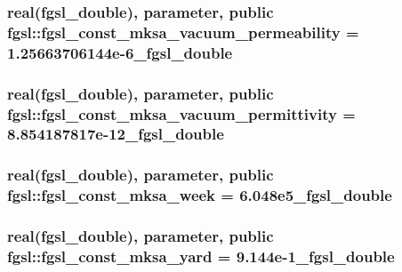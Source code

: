 \hypertarget{classfgsl_a16aee30f6ddf44068a051e80be1f1e0e}{
\subsubsection[{fgsl\-\_\-const\-\_\-mksa\-\_\-vacuum\-\_\-permeability}]{\setlength{\rightskip}{0pt plus 5cm}real({\bf fgsl\-\_\-double}), parameter, public fgsl\-::fgsl\-\_\-const\-\_\-mksa\-\_\-vacuum\-\_\-permeability = 1.\-25663706144e-\/6\-\_\-fgsl\-\_\-double}}\label{classfgsl_a16aee30f6ddf44068a051e80be1f1e0e}
\hypertarget{classfgsl_a74a2728881184d5037b397e55d24411d}{
\subsubsection[{fgsl\-\_\-const\-\_\-mksa\-\_\-vacuum\-\_\-permittivity}]{\setlength{\rightskip}{0pt plus 5cm}real({\bf fgsl\-\_\-double}), parameter, public fgsl\-::fgsl\-\_\-const\-\_\-mksa\-\_\-vacuum\-\_\-permittivity = 8.\-854187817e-\/12\-\_\-fgsl\-\_\-double}}\label{classfgsl_a74a2728881184d5037b397e55d24411d}
\hypertarget{classfgsl_aecb67f391facbac682484e9d352dac5e}{
\subsubsection[{fgsl\-\_\-const\-\_\-mksa\-\_\-week}]{\setlength{\rightskip}{0pt plus 5cm}real({\bf fgsl\-\_\-double}), parameter, public fgsl\-::fgsl\-\_\-const\-\_\-mksa\-\_\-week = 6.\-048e5\-\_\-fgsl\-\_\-double}}\label{classfgsl_aecb67f391facbac682484e9d352dac5e}
\hypertarget{classfgsl_a822a621129f787917e82b140d0814b72}{
\subsubsection[{fgsl\-\_\-const\-\_\-mksa\-\_\-yard}]{\setlength{\rightskip}{0pt plus 5cm}real({\bf fgsl\-\_\-double}), parameter, public fgsl\-::fgsl\-\_\-const\-\_\-mksa\-\_\-yard = 9.\-144e-\/1\-\_\-fgsl\-\_\-double}}\label{classfgsl_a822a621129f787917e82b140d0814b72}
